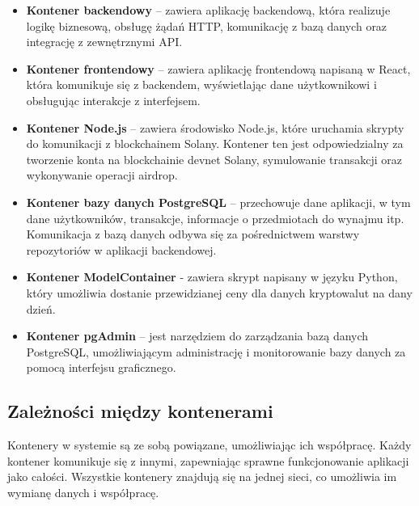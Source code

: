\begin{itemize}
    \item \textbf{Kontener backendowy} – zawiera aplikację backendową, która realizuje logikę biznesową, obsługę żądań HTTP, komunikację z bazą danych oraz integrację z zewnętrznymi API.
    \item \textbf{Kontener frontendowy} – zawiera aplikację frontendową napisaną w React, która komunikuje się z backendem, wyświetlając dane użytkownikowi i obsługując interakcje z interfejsem.
    \item \textbf{Kontener Node.js} – zawiera środowisko Node.js, które uruchamia skrypty do komunikacji z blockchainem Solany. Kontener ten jest odpowiedzialny za tworzenie konta na blockchainie devnet Solany, symulowanie transakcji oraz wykonywanie operacji airdrop.
    \item \textbf{Kontener bazy danych PostgreSQL} – przechowuje dane aplikacji, w tym dane użytkowników, transakcje, informacje o przedmiotach do wynajmu itp. Komunikacja z bazą danych odbywa się za pośrednictwem warstwy repozytoriów w aplikacji backendowej.
		\item \textbf{Kontener ModelContainer} - zawiera skrypt napisany w języku Python, który umożliwia dostanie przewidzianej ceny dla danych kryptowalut na dany dzień.
    \item \textbf{Kontener pgAdmin} – jest narzędziem do zarządzania bazą danych PostgreSQL, umożliwiającym administrację i monitorowanie bazy danych za pomocą interfejsu graficznego.
\end{itemize}

\subsection{Zależności między kontenerami}
Kontenery w systemie są ze sobą powiązane, umożliwiając ich współpracę. Każdy kontener komunikuje się z innymi, zapewniając sprawne funkcjonowanie aplikacji jako całości. Wszystkie kontenery znajdują się na jednej sieci, co umożliwia im wymianę danych i współpracę. 

